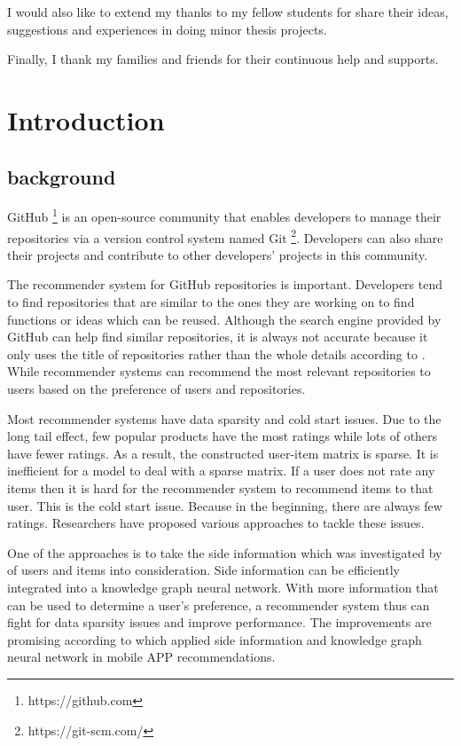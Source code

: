 \documentclass[11pt,twoside]{report}
\begin{document}
I would also like to extend my thanks to my fellow students for share their ideas, suggestions and experiences in doing minor thesis projects.

Finally, I thank my families and friends for their continuous help and supports.

{
    \hypersetup{linkcolor=black}
    \tableofcontents
    \listoffigures
    \listoftables
}


\chapter{Introduction}
\section{background}
GitHub \footnote{https://github.com} is an open-source community that enables developers to manage their repositories via a version control system named Git \footnote{https://git-scm.com/}. Developers can also share their projects and contribute to other developers’ projects in this community.

The recommender system for GitHub repositories is important. Developers tend to find repositories that are similar to the ones they are working on to find functions or ideas which can be reused. Although the search engine provided by GitHub can help find similar repositories, it is always not accurate because it only uses the title of repositories rather than the whole details according to \cite{xu_repersp_2017}. While recommender systems can recommend the most relevant repositories to users based on the preference of users and repositories.

Most recommender systems have data sparsity and cold start issues. Due to the long tail effect, few popular products have the most ratings while lots of others have fewer ratings. As a result, the constructed user-item matrix is sparse. It is inefficient for a model to deal with a sparse matrix. If a user does not rate any items then it is hard for the recommender system to recommend items to that user. This is the cold start issue. Because in the beginning, there are always few ratings. Researchers have proposed various approaches to tackle these issues.

One of the approaches is to take the side information which was investigated by \cite{jonschkowski_patterns_2016} of users and items into consideration. Side information can be efficiently integrated into a knowledge graph neural network. With more information that can be used to determine a user's preference, a recommender system thus can fight for data sparsity issues and improve performance. The improvements are promising according to \cite{zhang_knowledge_2020} which applied side information and knowledge graph neural network in mobile APP recommendations.
\end{document}
